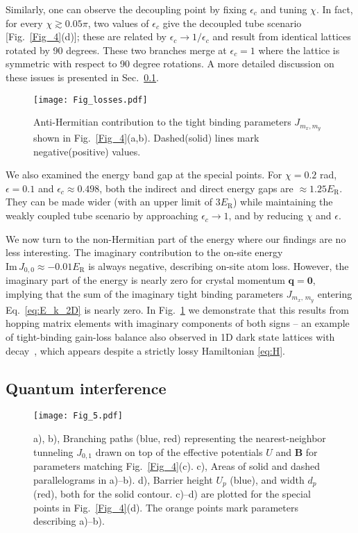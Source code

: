 \documentclass[aps,pra,twocolumn,showpacs,superscriptaddress,floatfix,longbibliography]{revtex4-1}
\def\Er{E_{\mathrm R}}                            			%
\def\Udd{U}
\def\Bdd{{\mathbf B}}
\begin{document}
Similarly, one can observe the decoupling point by fixing $\epsilon_c$ and tuning $\chi$.
In fact, for every $\chi \gtrsim 0.05 \pi$, two values of $\epsilon_c$ give the decoupled tube scenario [Fig.~\ref{Fig_4}(d)]; these are related by $\epsilon_c \rightarrow 1/\epsilon_c$ and result from identical lattices rotated by 90 degrees.
These two branches merge at $\epsilon_c = 1$ where the lattice is symmetric with respect to 90 degree rotations.
A more detailed discussion on these issues is presented in Sec.~\ref{sec_tube}.

\begin{figure}[t]
\centering
\texttt{[image: Fig\_losses.pdf]}
  \caption{Anti-Hermitian contribution to the tight binding parameters $J_{m_x, m_y}$ shown in Fig.~\ref{Fig_4}(a,b). Dashed(solid) lines mark negative(positive) values.}
  \label{Fig_losses}
\end{figure}

We also examined the energy band gap at the special points.
For $\chi = 0.2$ rad, $\epsilon = 0.1$ and $\epsilon_c \approx 0.498$, both the indirect and direct energy gaps are $\approx 1.25 \Er$.
They can be made wider (with an upper limit of $3 \Er$) while maintaining the weakly coupled tube scenario by approaching $\epsilon_c \rightarrow 1$, and by reducing $\chi$ and $\epsilon$.

We now turn to the non-Hermitian part of the energy where our findings are no less interesting.
The imaginary contribution to the on-site energy $ \text{Im} \, J_{0,0} \approx - 0.01 \Er$ is always negative, describing on-site atom loss.
However, the imaginary part of the energy is nearly zero for crystal momentum $\boldsymbol{q}=\mathbf{0}$, implying that the sum of the imaginary tight binding parameters $J_{m_x, \, m_y}$ entering Eq.~\eqref{eq:E_k_2D} is nearly zero.
In Fig.~\ref{Fig_losses} we demonstrate that this results from hopping matrix elements with imaginary components of both signs -- an example of tight-binding gain-loss balance also observed in 1D dark state lattices with decay~\cite{Gvozdiovas2021}, which appears despite a strictly lossy Hamiltonian \eqref{eq:H}.

\subsection{Quantum interference}
\label{sec_tube}

\begin{figure}[t]
\centering
  \texttt{[image: Fig\_5.pdf]}
  \caption{
  a), b), Branching paths (blue, red) representing the nearest-neighbor tunneling $J_{0,1}$ drawn on top of the effective potentials $\Udd$ and $\Bdd$ for parameters matching Fig.~\ref{Fig_4}(c).
  c), Areas of solid and dashed parallelograms in a)--b). 
  d), Barrier height $U_p$ (blue), and width $d_p$ (red), both for the solid contour. c)--d) are plotted for the special points in Fig.~\ref{Fig_4}(d). The orange points mark parameters describing a)--b).
  }
  \label{Fig_5}
\end{figure}
\end{document}

